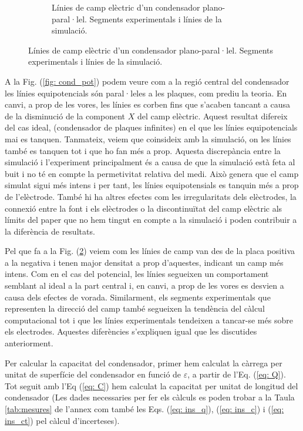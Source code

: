 \documentclass[11pt]{article}
\begin{document}
\begin{figure}[h]
\begin{subfigure}{0.495\textwidth}
        \caption{Línies de camp elèctric d'un condensador plano-paral·lel. Segments experimentals i línies de la simulació.}
        \label{fig: cond_e}
    \end{subfigure}
\end{figure}

A la Fig. (\ref{fig: cond_pot}) podem veure com a la regió central del condensador les línies equipotencials són paral·leles a les plaques, com prediu la teoria. En canvi, a prop de les vores, les línies es corben fins que s'acaben tancant a causa de la disminució de la component $X$ del camp elèctric. Aquest resultat difereix del cas ideal, (condensador de plaques infinites) en el que les línies equipotencials mai es tanquen. Tanmateix, veiem que coinsideix amb la simulació, on les línies també es tanquen tot i que ho fan més a prop. Aquesta discrepància entre la simulació i l'experiment principalment és a causa de que la simulació està feta al buit i no té en compte la permetivitat relativa del medi. Això genera que el camp simulat sigui més intens i per tant, les línies equipotensials es tanquin més a prop de l'elèctrode. També hi ha altres efectes com les irregularitats dels elèctrodes, la connexió entre la font i els elèctrodes o la discontinuïtat del camp elèctric als límits del paper que no hem tingut en compte a la simulació i poden contribuir a la diferència de resultats.

Pel que fa a la Fig. (\ref{fig: cond_e}) veiem com les línies de camp van des de la placa positiva a la negativa i tenen major densitat a prop d'aquestes, indicant un camp més intens. Com en el cas del potencial, les línies segueixen un comportament semblant al ideal a la part central i, en canvi, a prop de les vores es desvien a causa dels efectes de vorada. Similarment, els segments experimentals que representen la direcció del camp també segueixen la tendència del càlcul computacional tot i que les línies experimentals tendeixen a tancar-se més sobre els electrodes. Aquestes diferències s'expliquen igual que les discutides anteriorment.

Per calcular la capacitat del condensador, primer hem calculat la càrrega per unitat de superfície del condensador en funció de $\varepsilon$, a partir de l'Eq. (\ref{eq: Q}). Tot seguit amb l'Eq (\ref{eq: C}) hem calculat la capacitat per unitat de longitud del condensador (Les dades necessaries per fer els càlculs es poden trobar a la Taula \ref{tab:mesures} de l'annex com també les Eqs. (\ref{eq: ins_q}), (\ref{eq: ins_c}) i (\ref{eq: ins_ct}) pel càlcul d'incerteses).
\end{document}
